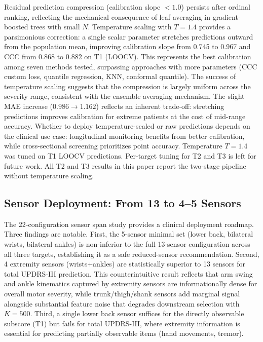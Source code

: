 \documentclass[11pt,a4paper]{article}
\begin{document}
Residual prediction compression (calibration slope $<1.0$) persists after ordinal ranking, reflecting the mechanical consequence of leaf averaging in gradient-boosted trees with small $N$. Temperature scaling with $T=1.4$ provides a parsimonious correction: a single scalar parameter stretches predictions outward from the population mean, improving calibration slope from 0.745 to 0.967 and CCC from 0.868 to 0.882 on T1 (LOOCV). This represents the best calibration among seven methods tested, surpassing approaches with more parameters (CCC custom loss, quantile regression, KNN, conformal quantile). The success of temperature scaling suggests that the compression is largely uniform across the severity range, consistent with the ensemble averaging mechanism. The slight MAE increase ($0.986 \rightarrow 1.162$) reflects an inherent trade-off: stretching predictions improves calibration for extreme patients at the cost of mid-range accuracy. Whether to deploy temperature-scaled or raw predictions depends on the clinical use case: longitudinal monitoring benefits from better calibration, while cross-sectional screening prioritizes point accuracy. Temperature $T=1.4$ was tuned on T1 LOOCV predictions. Per-target tuning for T2 and T3 is left for future work. All T2 and T3 results in this paper report the two-stage pipeline without temperature scaling.

\subsection{Sensor Deployment: From 13 to 4--5 Sensors}

The 22-configuration sensor span study provides a clinical deployment roadmap. Three findings are notable. First, the 5-sensor minimal set (lower back, bilateral wrists, bilateral ankles) is non-inferior to the full 13-sensor configuration across all three targets, establishing it as a safe reduced-sensor recommendation. Second, 4 extremity sensors (wrists+ankles) are statistically superior to 13 sensors for total UPDRS-III prediction. This counterintuitive result reflects that arm swing and ankle kinematics captured by extremity sensors are informationally dense for overall motor severity, while trunk/thigh/shank sensors add marginal signal alongside substantial feature noise that degrades downstream selection with $K=500$. Third, a single lower back sensor suffices for the directly observable subscore (T1) but fails for total UPDRS-III, where extremity information is essential for predicting partially observable items (hand movements, tremor).
\end{document}
